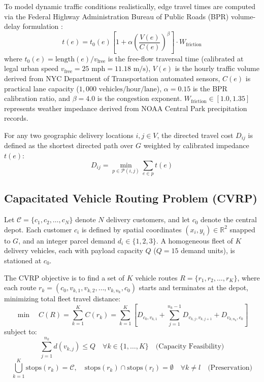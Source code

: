 \documentclass[journal,10pt]{IEEEtran}
\begin{document}
To model dynamic traffic conditions realistically, edge travel times are computed via the Federal Highway Administration Bureau of Public Roads (BPR) volume-delay formulation \cite{bpr1964traffic}:
\begin{equation}
\label{eq:bpr}
t(e) = t_0(e) \left[ 1 + \alpha \left(\frac{V(e)}{C(e)}\right)^\beta \right] \cdot W_{\text{friction}}
\end{equation}
where $t_0(e) = \text{length}(e) / v_{\text{free}}$ is the free-flow traversal time (calibrated at legal urban speed $v_{\text{free}} = 25\text{ mph} = 11.18\text{ m/s}$), $V(e)$ is the hourly traffic volume derived from NYC Department of Transportation automated sensors, $C(e)$ is practical lane capacity ($1,000\text{ vehicles/hour/lane}$), $\alpha = 0.15$ is the BPR calibration ratio, and $\beta = 4.0$ is the congestion exponent. $W_{\text{friction}} \in [1.0, 1.35]$ represents weather impedance derived from NOAA Central Park precipitation records.

For any two geographic delivery locations $i, j \in V$, the directed travel cost $D_{ij}$ is defined as the shortest directed path over $G$ weighted by calibrated impedance $t(e)$:
\begin{equation}
D_{ij} = \min_{p \in \mathcal{P}(i, j)} \sum_{e \in p} t(e)
\end{equation}

\subsection{Capacitated Vehicle Routing Problem (CVRP)}
Let $\mathcal{C} = \{c_1, c_2, \dots, c_N\}$ denote $N$ delivery customers, and let $c_0$ denote the central depot. Each customer $c_i$ is defined by spatial coordinates $(x_i, y_i) \in \mathbb{R}^2$ snapped to $G$, and an integer parcel demand $d_i \in \{1, 2, 3\}$. A homogeneous fleet of $K$ delivery vehicles, each with payload capacity $Q$ ($Q = 15$ demand units), is stationed at $c_0$.

The CVRP objective is to find a set of $K$ vehicle routes $R = \{r_1, r_2, \dots, r_K\}$, where each route $r_k = (c_0, v_{k, 1}, v_{k, 2}, \dots, v_{k, n_k}, c_0)$ starts and terminates at the depot, minimizing total fleet travel distance:
\begin{equation}
\min \quad C(R) = \sum_{k=1}^K C(r_k) = \sum_{k=1}^K \left[ D_{c_0, v_{k, 1}} + \sum_{j=1}^{n_k - 1} D_{v_{k, j}, v_{k, j+1}} + D_{v_{k, n_k}, c_0} \right]
\end{equation}
subject to:
\begin{equation}
\sum_{j=1}^{n_k} d(v_{k, j}) \le Q \quad \forall k \in \{1, \dots, K\} \quad \text{(Capacity Feasibility)}
\end{equation}
\begin{equation}
\bigcup_{k=1}^K \text{stops}(r_k) = \mathcal{C}, \quad \text{stops}(r_k) \cap \text{stops}(r_l) = \emptyset \quad \forall k \ne l \quad \text{(Preservation)}
\end{equation}
\end{document}
